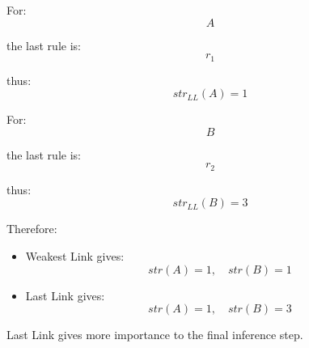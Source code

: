 \documentclass[11pt]{article}
\begin{document}
\bigskip

For:
\[
A
\]

the last rule is:
\[
r_1
\]

thus:
\[
str_{LL}(A)=1
\]

For:
\[
B
\]

the last rule is:
\[
r_2
\]

thus:
\[
str_{LL}(B)=3
\]

\bigskip

Therefore:
\begin{itemize}
    \item Weakest Link gives:
    \[
    str(A)=1,\quad str(B)=1
    \]

    \item Last Link gives:
    \[
    str(A)=1,\quad str(B)=3
    \]
\end{itemize}

\bigskip

Last Link gives more importance to the final inference step.
\end{document}
